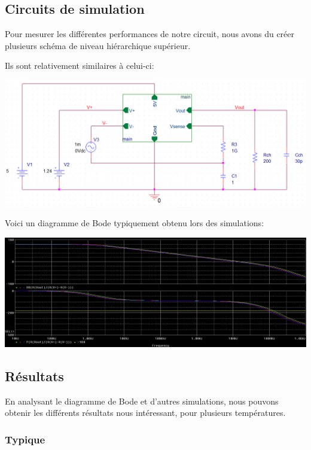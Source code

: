 \documentclass{article}
\begin{document}
\subsection{Circuits de simulation}

Pour mesurer les différentes performances de notre circuit, nous avons du créer plusieurs schéma de niveau hiérarchique supérieur.

Ils sont relativement similaires à celui-ci:

\begin{center}
\includegraphics[width=\linewidth-5cm]{schema_bode.png}
\end{center}

Voici un diagramme de Bode typiquement obtenu lors des simulations:

\includegraphics[width=\linewidth]{bode_typique.png}

\subsection{Résultats}

En analysant le diagramme de Bode et d’autres simulations, nous pouvons obtenir les différents résultats nous intéressant, pour plusieurs températures.

\subsubsection{Typique}
\end{document}
